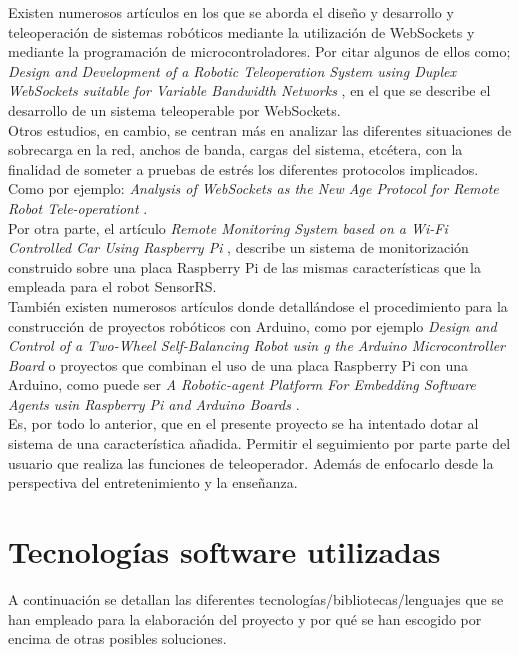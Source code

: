Existen numerosos artículos en los que se aborda el diseño y desarrollo y teleoperación de sistemas robóticos mediante la utilización de WebSockets y mediante la programación de microcontroladores. Por citar algunos de ellos como; \emph{Design and Development of a Robotic Teleoperation System using
Duplex WebSockets suitable for Variable Bandwidth Networks} \cite{article:1}, en el que se describe el desarrollo de un sistema teleoperable por WebSockets.\\
  
Otros estudios, en cambio, se centran más en analizar las diferentes situaciones de sobrecarga en la red, anchos de banda, cargas del sistema, etcétera, con la finalidad de someter a pruebas de estrés
los diferentes protocolos implicados. Como por ejemplo: \emph{Analysis of WebSockets as the New Age Protocol for Remote Robot Tele-operationt} \cite{article:2}.\\
  
Por otra parte, el artículo \emph{ Remote Monitoring System based on a Wi-Fi Controlled Car Using Raspberry Pi } \cite{article:3}, describe un sistema de monitorización construido sobre una placa 
Raspberry Pi de las mismas características que la empleada para el robot SensorRS.\\ 
  
  
También existen numerosos artículos donde detallándose el procedimiento para la construcción de proyectos robóticos con Arduino, como por ejemplo \emph{Design and Control of a Two-Wheel Self-Balancing Robot usin
g the Arduino Microcontroller Board} \cite{article-4} o proyectos que combinan el uso de una placa Raspberry Pi con una Arduino, como puede ser \emph{A Robotic-agent Platform For Embedding Software Agents usin Raspberry Pi and Arduino Boards} \cite{article:5}.\\
  
 
Es, por todo lo anterior, que en el presente proyecto se ha intentado dotar al sistema de una característica añadida. Permitir el seguimiento por parte parte del usuario que realiza las funciones de teleoperador. Además de enfocarlo
desde la perspectiva del entretenimiento y la enseñanza.\\


\section{Tecnologías software utilizadas}

A continuación se detallan las diferentes tecnologías/bibliotecas/lenguajes que se han empleado para la elaboración del proyecto y por qué se han escogido por encima de otras posibles soluciones.

